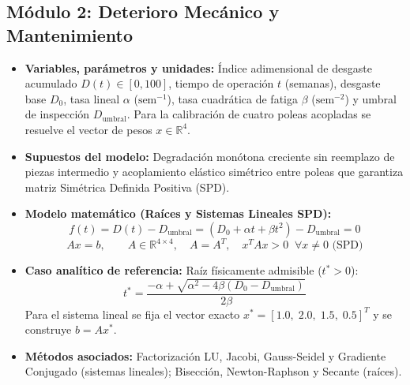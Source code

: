 \documentclass[a4paper,12pt]{article}
\begin{document}
\subsection{Módulo 2: Deterioro Mecánico y Mantenimiento}
\begin{itemize}
    \item \textbf{Variables, parámetros y unidades:} Índice adimensional de desgaste acumulado $D(t) \in [0, 100]$, tiempo de operación $t$ (semanas), desgaste base $D_0$, tasa lineal $\alpha$ ($\text{sem}^{-1}$), tasa cuadrática de fatiga $\beta$ ($\text{sem}^{-2}$) y umbral de inspección $D_{\text{umbral}}$. Para la calibración de cuatro poleas acopladas se resuelve el vector de pesos $x \in \mathbb{R}^4$.
    \item \textbf{Supuestos del modelo:} Degradación monótona creciente sin reemplazo de piezas intermedio y acoplamiento elástico simétrico entre poleas que garantiza matriz Simétrica Definida Positiva (SPD).
    \item \textbf{Modelo matemático (Raíces y Sistemas Lineales SPD):}
    \begin{equation}
        f(t) = D(t) - D_{\text{umbral}} = \left(D_0 + \alpha t + \beta t^2\right) - D_{\text{umbral}} = 0
    \end{equation}
    \begin{equation}
        A x = b, \qquad A \in \mathbb{R}^{4 \times 4}, \quad A = A^T, \quad x^T A x > 0 \;\; \forall x \neq 0 \text{ (SPD)}
    \end{equation}
    \item \textbf{Caso analítico de referencia:} Raíz físicamente admisible ($t^* > 0$):
    \begin{equation}
        t^* = \frac{-\alpha + \sqrt{\alpha^2 - 4\beta(D_0 - D_{\text{umbral}})}}{2\beta}
    \end{equation}
    Para el sistema lineal se fija el vector exacto $x^* = [1.0,\; 2.0,\; 1.5,\; 0.5]^T$ y se construye $b = A x^*$.
    \item \textbf{Métodos asociados:} Factorización LU, Jacobi, Gauss-Seidel y Gradiente Conjugado (sistemas lineales); Bisección, Newton-Raphson y Secante (raíces).
\end{itemize}
\end{document}
